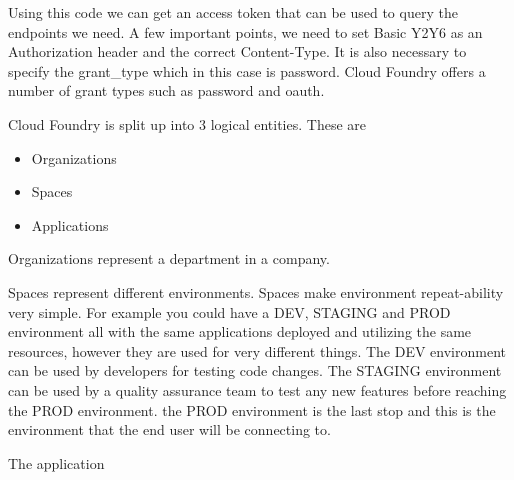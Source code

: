 Using this code we can get an access token that can be used to query the endpoints we need. A few important points, we need to set Basic Y2Y6 as an Authorization header and the correct Content-Type. It is also necessary to specify the grant\_type which in this case is password. Cloud Foundry offers a number of grant types such as password and oauth. 

Cloud Foundry is split up into 3 logical entities. These are

\begin{itemize}
  \item Organizations
  \item Spaces
  \item Applications
\end{itemize}

Organizations represent a department in a company.

Spaces represent different environments. Spaces make environment repeat-ability very simple. For example you could have a DEV, STAGING and PROD environment all with the same applications deployed and utilizing the same resources, however they are used for very different things. The DEV environment can be used by developers for testing code changes. The STAGING environment can be used by a quality assurance team to test any new features before reaching the PROD environment. the PROD environment is the last stop and this is the environment that the end user will be connecting to.

The application